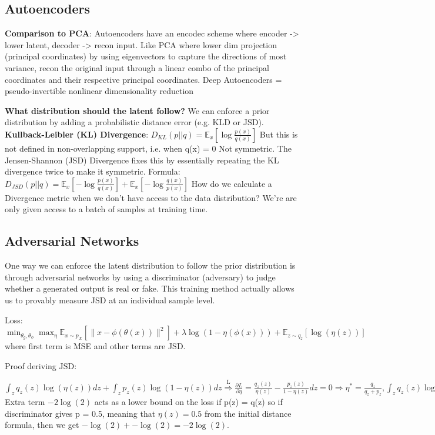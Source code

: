 

\subsection*{Autoencoders}
\textbf{Comparison to PCA}: Autoencoders have an encodec scheme where  encoder -> lower latent, decoder -> recon input. 
Like PCA where lower dim projection (principal coordinates) by using eigenvectors to capture the directions of most variance, recon the original input through a linear combo of the principal coordinates and their respective principal coordinates.
Deep Autoencoders = pseudo-invertible nonlinear dimensionality reduction 

\textbf{What distribution should the latent follow?}
We can enforce a prior distribution by adding a probabilistic distance error (e.g. KLD or JSD). 
\textbf{Kullback-Leibler (KL) Divergence}:
$D_{KL}(p||q) = \mathbb{E}_{x}\left[\log \frac{p(x)}{q(x)}\right]$
But this is not defined in non-overlapping support, i.e. when q(x) = 0
Not symmetric. The Jensen-Shannon (JSD) Divergence fixes this by essentially repeating the KL divergence twice to make it symmetric. Formula: 
$D_{JSD}(p||q) = \mathbb{E}_{x}\left[-\log \frac{p(x)}{q(x)}\right] + \mathbb{E}_{x}\left[-\log \frac{q(x)}{p(x)}\right]$
How do we calculate a Divergence metric when we don't have access to the data distribution? We're are only given access to a batch of samples at training time. 

\subsection*{Adversarial Networks}
One way we can enforce the latent distribution to follow the prior distribution is through adversarial networks by using a discriminator (adversary) to judge whether a generated output is real or fake. This training method actually allows us to provably measure JSD at an individual sample level. 

Loss: $\min_{\theta_g,\theta_\phi} \max_{\eta} \mathbb{E}_{x\sim p_X}[\|x - \phi(\theta(x))\|^2] + \lambda \log(1 - \eta(\phi(x))) + \mathbb{E}_{z\sim q_z}[\log(\eta(z))]$ where first term is MSE and other terms are JSD. 

Proof deriving JSD:

$\int_{z} q_z(z) \log(\eta(z)) dz + \int_{z} p_z(z) \log(1 - \eta(z)) dz \overset{\text{L}}{\Longrightarrow} \frac{\partial L}{\partial \eta} = \frac{q_z(z)}{\eta(z)} - \frac{p_z(z)}{1 - \eta(z)} dz = 0 \Rightarrow \eta^* = \frac{q_z}{q_z + p_z}, 
\int_{z} q_z(z) \log\left(\frac{q_z}{q_z + p_z}\right) dz + \int_{z} p_z(z) \log\left(1 - \frac{q_z}{q_z + p_z}\right) dz = \int_{z} q_z(z) \log\left(\frac{q_z}{q_z + p_z}\right) dz + \int_{z} p_z(z) \log\left(\frac{p_z}{q_z + p_z}\right) dz = 
\int_{z} q_z(z) \log\left(\frac{q_z}{q_z + p_z}\right) dz + \int_{z} p_z(z) \log\left(\frac{p_z}{q_z + p_z}\right) dz - 2\log(2)= 2 JS(q_z, p_z) - 2\log(2)$
Extra term $-2\log(2)$ acts as a lower bound on the loss if p(z) = q(z) so if discriminator gives p = 0.5, meaning that $\eta(z) = 0.5$ from the initial distance formula, then we get $-\log(2) + -\log(2) = -2\log(2)$. 


